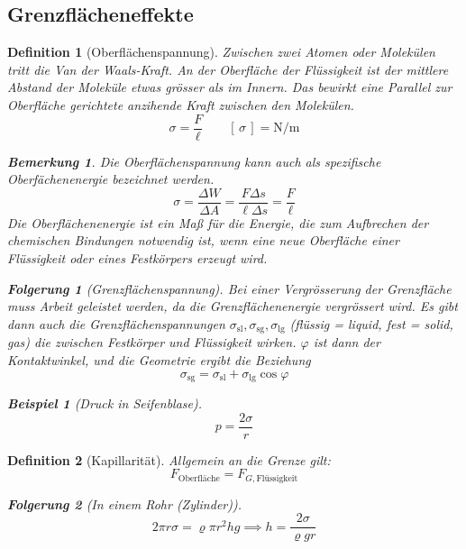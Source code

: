 \documentclass[a4paper, twocolumn]{article}
\numberwithin{equation}{section}
\theoremstyle{hsr-def}
\newtheorem{definition}{Definition}[section]
\theoremstyle{hsr-sub}
\newtheorem{result}{Folgerung}[definition]
\newtheorem{example}{Beispiel}[definition]
\newtheorem{remark}{Bemerkung}[definition]
\newcommand{\unitof}[1]{\ensuremath{\left[\,#1\,\right]}}
\begin{document}
\subsection{Grenzfl\"acheneffekte}

\begin{definition}[Oberfl\"achenspannung]
Zwischen zwei Atomen oder Molek\"ulen tritt die \emph{Van der Waals}-Kraft.
An der Oberfl\"ache der Fl\"ussigkeit ist der mittlere Abstand der Molek\"ule etwas gr\"osser als im Innern. Das bewirkt eine Parallel zur Oberfl\"ache gerichtete anzihende Kraft zwischen den Molek\"ulen.
\[
    \sigma = \frac{F}{\ell}
    \qquad
    \unitof{\sigma} = \si{\newton\per\metre}
\]
\begin{remark}
Die Oberfl\"achenspannung kann auch als \emph{spezifische Oberf\"achenenergie} bezeichnet werden.
\[
    \sigma
    = \frac{\Delta W}{\Delta A} 
    = \frac{F\Delta s}{\ell \Delta s}
    = \frac{F}{\ell}
\]
Die \emph{Oberfl\"achenenergie} ist ein Ma{\ss} f\"ur die Energie, die zum Aufbrechen der chemischen Bindungen notwendig ist, wenn eine neue Oberfl\"ache einer Fl\"ussigkeit oder eines Festkörpers erzeugt wird.
\end{remark}

\begin{result}[Grenzfl\"achenspannung]
Bei einer Vergr\"osserung der Grenzfl\"ache muss Arbeit geleistet werden, da die Grenzfl\"achenenergie vergr\"ossert wird.
Es gibt dann auch die Grenzfl\"achenspannungen 
\(
    \sigma_\text{sl},
    \sigma_\text{sg},
    \sigma_\text{lg}
\) (fl\"ussig = liquid, fest = solid, gas) die zwischen Festk\"orper und Fl\"ussigkeit wirken. \(\varphi\) ist dann der \emph{Kontaktwinkel}, und die Geometrie ergibt die Beziehung
\[
    \sigma_\text{sg} = \sigma_\text{sl} + \sigma_\text{lg} \cos \varphi
\]
\end{result}

\begin{example}[Druck in Seifenblase]
\[
    p = \frac{2\sigma}{r}
\]
\end{example}
\end{definition}

\begin{definition}[Kapillarit\"at]
Allgemein an die Grenze gilt:
\[
    F_\text{Oberfl\"ache} = F_{G,\text{Fl\"ussigkeit}}
\]
\begin{result}[In einem Rohr (Zylinder)]
\[
    2\pi r\sigma = \varrho\pi r^2 hg \implies  h = \frac{2\sigma}{\varrho g r}
\]
\end{result}
\end{definition}
\end{document}
